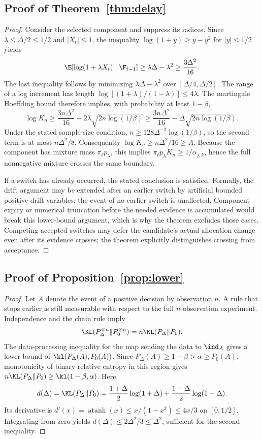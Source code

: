 \subsection{Proof of Theorem~\ref{thm:delay}}
\begin{proof}
Consider the selected component and suppress its indices. Since $\lambda\le\Delta/2\le1/2$ and $|X_t|\le1$, the inequality $\log(1+y)\ge y-y^2$ for $|y|\le1/2$ yields
\[
 \E[\log(1+\lambda X_t)\mid\F_{t-1}]
 \ge\lambda\Delta-\lambda^2
 \ge\frac{3\Delta^2}{16}.
\]
The last inequality follows by minimizing $\lambda\Delta-\lambda^2$ over $[\Delta/4,\Delta/2]$.
The range of a log increment has length
$\log[(1+\lambda)/(1-\lambda)]\le4\lambda$.
The martingale Hoeffding bound therefore implies, with probability at least $1-\beta$,
\[
 \log K_n\ge\frac{3n\Delta^2}{16}
            -2\lambda\sqrt{2n\log(1/\beta)}
 \ge\frac{3n\Delta^2}{16}
            -\Delta\sqrt{2n\log(1/\beta)}.
\]
Under the stated sample-size condition, $n\ge128\Delta^{-2}\log(1/\beta)$, so the second term is at most $n\Delta^2/8$. Consequently
$\log K_n\ge n\Delta^2/16\ge A$.
Because the component has mixture mass $\pi_\ell p_\lambda$, this implies
$\pi_\ell p_\lambda K_n\ge1/\alpha_{j,k}$, hence the full nonnegative mixture crosses the same boundary.

If a switch has already occurred, the stated conclusion is satisfied. Formally, the drift argument may be extended after an earlier switch by artificial bounded positive-drift variables; the event of no earlier switch is unaffected. Component expiry or numerical truncation before the needed evidence is accumulated would break this lower-bound argument, which is why the theorem excludes those cases. Competing accepted switches may defer the candidate's actual allocation change even after its evidence crosses; the theorem explicitly distinguishes crossing from acceptance.
\end{proof}

\subsection{Proof of Proposition~\ref{prop:lower}}
\begin{proof}
Let $A$ denote the event of a positive decision by observation $n$. A rule that stops earlier is still measurable with respect to the full $n$-observation experiment. Independence and the chain rule imply
\[
 \KL(P_\Delta^{\otimes n}\Vert P_0^{\otimes n})
 =n\KL(P_\Delta\Vert P_0).
\]
The data-processing inequality for the map sending the data to $\ind_A$ gives a lower bound of
$\kl(P_\Delta(A),P_0(A))$.
Since $P_\Delta(A)\ge1-\beta>\alpha\ge P_0(A)$, monotonicity of binary relative entropy in this region gives
$n\KL(P_\Delta\Vert P_0)\ge\kl(1-\beta,\alpha)$.
Here
\[
 d(\Delta)=\KL(P_\Delta\Vert P_0)
 =\frac{1+\Delta}{2}\log(1+\Delta)
  +\frac{1-\Delta}{2}\log(1-\Delta).
\]
Its derivative is $d'(x)=\operatorname{atanh}(x)\le x/(1-x^2)\le4x/3$ on $[0,1/2]$. Integrating from zero yields $d(\Delta)\le2\Delta^2/3\le\Delta^2$, sufficient for the second inequality.
\end{proof}

